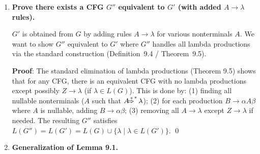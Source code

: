 \begin{enumerate}[{9.}1. ]
\begin{enumerate}
$S_3 \to S_3\pmb{e} \mid ?$ --- there's no base case for $S_3$ given. Assuming $S_3$ should have a base; looking at $S_1 \to \pmb{d}S_3$, $S_3$ appears only through $S_3 \to S_3\pmb{e}$, which is left-recursive with no base. This may indicate $L(S_3) = \emptyset$ unless there is a missing production. Assuming the grammar is as given and we treat $S_3 \to S_3\pmb{e}$ as the only rule for $S_3$: $S_3$ generates no terminal strings (left-recursive with no base). Then $S_1 \to \pmb{d}S_3$ generates nothing. So we focus on $S_1 \to S_1 S_2\pmb{c} \mid \pmb{d}S_3$ (empty) and $S_2 \to S_1 S_1 \mid \pmb{a}$.

For the left-recursive part: $S_1 \to S_1 S_2\pmb{c} \mid \pmb{d}S_3$ (taking $S_3$ as non-empty via some additional rule like $S_3 \to \pmb{d}$):
If $S_3 \to \pmb{d}$ (assumed), then $S_1 \to \pmb{d}S_3 \to \pmb{dd}$ and $S_1 \to S_1 S_2\pmb{c}$.
Eliminate left recursion: $S_1 \to \pmb{dd}S_1'$, $S_1' \to S_2\pmb{c}S_1' \mid \lambda$.
Substitute $S_2 \to S_1 S_1 \mid \pmb{a}$:
$S_1' \to S_1 S_1\pmb{c}S_1' \mid \pmb{a}\pmb{c}S_1' \mid \pmb{ac} \mid \ldots$
Continue substituting to get GNF; each step replaces leading nonterminals with their GNF expansions.
\end{enumerate}

\item \textbf{Prove there exists a CFG $G''$ equivalent to $G'$ (with added $A\to\lambda$ rules).}

$G'$ is obtained from $G$ by adding rules $A \to \lambda$ for various nonterminals $A$. We want to show $G''$ equivalent to $G'$ where $G''$ handles all lambda productions via the standard construction (Definition~9.4 / Theorem~9.5).

\textbf{Proof}: The standard elimination of lambda productions (Theorem 9.5) shows that for any CFG, there is an equivalent CFG with no lambda productions except possibly $Z \to \lambda$ (if $\lambda \in L(G)$). This is done by: (1) finding all nullable nonterminals ($A$ such that $A \DRightarrow^* \lambda$); (2) for each production $B \to \alpha A \beta$ where $A$ is nullable, adding $B \to \alpha\beta$; (3) removing all $A \to \lambda$ except $Z \to \lambda$ if needed. The resulting $G''$ satisfies $L(G'') = L(G') = L(G) \cup \{\lambda \mid \lambda \in L(G')\}$. \qed

\item \textbf{Generalization of Lemma 9.1.}


\end{enumerate}

